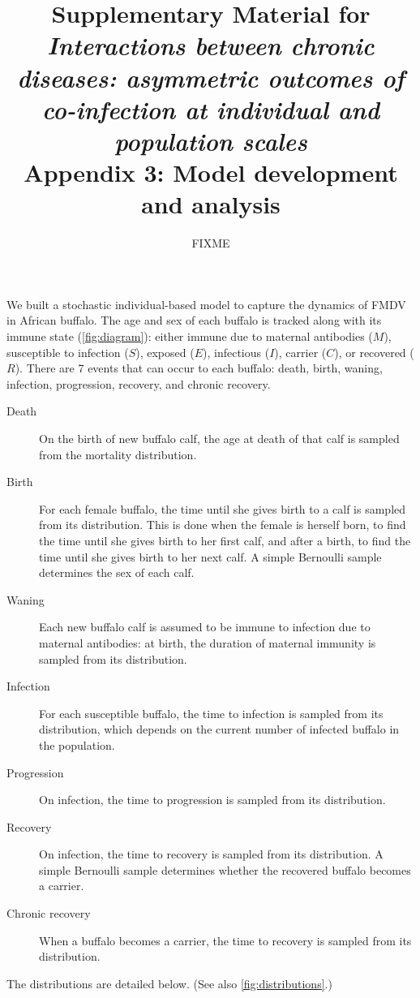\documentclass[12pt]{article}
\title{Supplementary Material for\\
  \emph{Interactions between chronic diseases: asymmetric outcomes of
    co-infection at individual and population scales} \\
  Appendix 3: Model development and analysis}
\author{FIXME}
\begin{document}
\maketitle


We built a stochastic individual-based model to capture the dynamics
of FMDV in African buffalo.  The age and sex of each buffalo is
tracked along with its immune state (\autoref{fig:diagram}): either
immune due to maternal antibodies ($M$), susceptible to infection
($S$), exposed ($E$), infectious ($I$), carrier ($C$), or recovered
($R$).  There are 7 events that can occur to each buffalo: death,
birth, waning, infection, progression, recovery, and chronic
recovery.
\begin{description}
\item[Death] On the birth of new buffalo calf, the age at death of
  that calf is sampled from the mortality distribution.

\item[Birth] For each female buffalo, the time until she gives birth
  to a calf is sampled from its distribution.  This is done when the
  female is herself born, to find the time until she gives birth to
  her first calf, and after a birth, to find the time until she gives
  birth to her next calf.  A simple Bernoulli sample determines the
  sex of each calf.

\item[Waning] Each new buffalo calf is assumed to be
  immune to infection due to maternal antibodies: at birth, the
  duration of maternal immunity is sampled from its distribution.

\item[Infection] For each susceptible buffalo, the time to infection
  is sampled from its distribution, which depends on the current
  number of infected buffalo in the population.

\item[Progression] On infection, the time to progression is sampled
  from its distribution.

\item[Recovery] On infection, the time to recovery is sampled from its
  distribution.  A simple Bernoulli sample determines whether the
  recovered buffalo becomes a carrier.

\item[Chronic recovery] When a buffalo becomes a carrier, the time to
  recovery is sampled from its distribution.
\end{description}
The distributions are detailed below.  (See also \autoref{fig:distributions}.)
\end{document}
